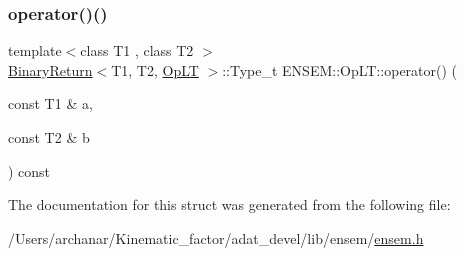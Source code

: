 \mbox{\label{structENSEM_1_1OpLT_af52d16f9a101e3c95c415857a2da4425}} 
\subsubsection{\texorpdfstring{operator()()}{operator()()}\hspace{0.1cm}{\footnotesize\ttfamily [2/2]}}
{\footnotesize\ttfamily template$<$class T1 , class T2 $>$ \\
\mbox{\hyperlink{structENSEM_1_1BinaryReturn}{Binary\+Return}}$<$T1, T2, \mbox{\hyperlink{structENSEM_1_1OpLT}{Op\+LT}} $>$\+::Type\+\_\+t E\+N\+S\+E\+M\+::\+Op\+L\+T\+::operator() (\begin{DoxyParamCaption}\item[{const T1 \&}]{a,  }\item[{const T2 \&}]{b }\end{DoxyParamCaption}) const\hspace{0.3cm}{\ttfamily [inline]}}



The documentation for this struct was generated from the following file\+:\begin{DoxyCompactItemize}
\item 
/\+Users/archanar/\+Kinematic\+\_\+factor/adat\+\_\+devel/lib/ensem/\mbox{\hyperlink{lib_2ensem_2ensem_8h}{ensem.\+h}}\end{DoxyCompactItemize}
